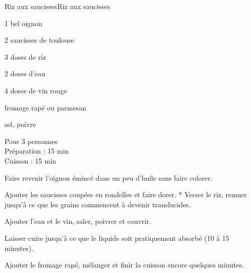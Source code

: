 \begin{recette}{Riz aux saucisses}{Riz aux saucisses}

\begin{ingredients}
1 bel oignon\par
2 saucisses de toulouse\par
3 doses de riz\par
2 doses d'eau\par
4 doses de vin rouge\par
fromage rapé ou parmesan\par
sel, poivre\par
\end{ingredients}

\begin{infos}
Pour 3 personnes\\
Préparation : 15 min\\
Cuisson : 15 min\\
\end{infos}

\begin{etapes}
\item Faire revenir l'oignon émincé dans un peu d'huile sans faire colorer.
\item Ajouter les saucisses coupées en rondelles et faire dorer. * Verser le riz, remuer jusqu'à ce que les grains commencent à devenir translucides.
\item Ajouter l'eau et le vin, saler, poivrer et couvrir.
\item Laisser cuire jusqu'à ce que le liquide soit pratiquement absorbé (10 à 15 minutes).
\item Ajouter le fromage rapé, mélanger et finir la cuisson encore quelques minutes.
\end{etapes}

\end{recette}